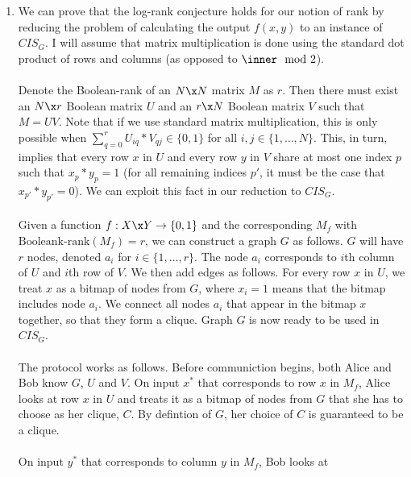 \documentclass{article}
\begin{document}
\begin{enumerate}
\begin{enumerate}
    \end{enumerate}

    \item We can prove that the log-rank conjecture holds for our notion of
        rank by reducing the problem of calculating the output $f(x, y)$ to an
        instance of $CIS_G$. I will assume that matrix multiplication is done
        using the standard dot product of rows and columns (as opposed to
        $\inner \mod 2$).
        \\\\
        Denote the Boolean-rank of an $N \x N$ matrix $M$ as $r$. Then there
        must exist an $N \x r$ Boolean matrix $U$ and an $r \x N$ Boolean
        matrix $V$ such that $M = UV$. Note that if we use standard matrix
        multiplication, this is only possible when $\sum_{q=0}^r U_{iq} *
        V_{qj} \in \{0,1\}$ for all $i,j \in \{ 1, \ldots, N \}$. This, in
        turn, implies that every row $x$ in $U$ and every row $y$ in $V$ share
        at most one index $p$ such that $x_p * y_p = 1$ (for all remaining
        indices $p'$, it must be the case that $x_{p'} * y_{p'} = 0$). We can
        exploit this fact in our reduction to $CIS_G$.
        \\\\
        Given a function $f: X \x Y \rightarrow \{ 0,1 \}$ and the
        corresponding $M_f$ with $\textrm{Booleank-rank}(M_f) = r$, we can
        construct a graph $G$ as follows. $G$ will have $r$ nodes, denoted
        $a_i$ for $i \in \{ 1, \ldots, r \}.$ The node $a_i$ corresponds to
        $i$th column of $U$ and $i$th row of $V$. We then add edges as follows.
        For every row $x$ in $U$, we treat $x$ as a bitmap of nodes from $G$,
        where $x_i = 1$ means that the bitmap includes node $a_i$.  We connect
        all nodes $a_i$ that appear in the bitmap $x$ together, so that they
        form a clique. Graph $G$ is now ready to be used in $CIS_G$.
        \\\\
        The protocol works as follows. Before communiction begins, both Alice
        and Bob know $G$, $U$ and $V$. On input $x^*$ that corresponds to row
        $x$ in $M_f$, Alice looks at row $x$ in $U$ and treats it as a bitmap
        of nodes from $G$ that she has to choose as her clique, $C$. By
        defintion of $G$, her choice of $C$ is guaranteed to be a clique.
        \\\\
        On input $y^*$ that corresponds to column $y$ in $M_f$, Bob looks at

\end{enumerate}
\end{document}
